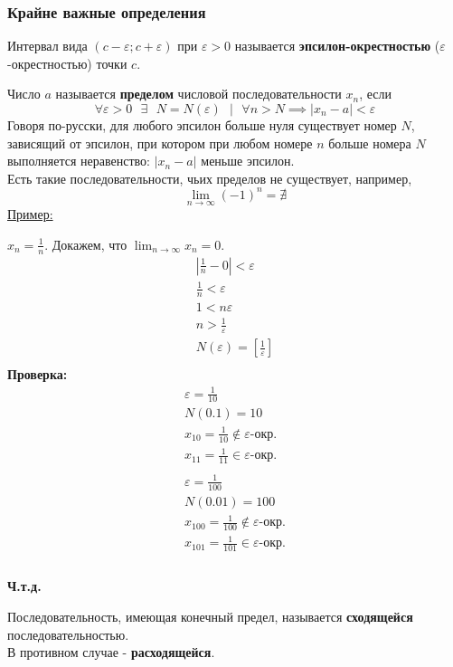 \documentclass[12pt]{article}
\begin{document}
    \subsubsection*{Крайне важные определения}
    \noindent Интервал вида $(c - \varepsilon; c + \varepsilon)$ при $\varepsilon > 0$ называется \textbf{эпсилон-окрестностью} ($\varepsilon$-окрестностью) точки $c$.\par\noindent
    Число $a$ называется \textbf{пределом} числовой последовательности $x_n$, если 
    \[\forall \varepsilon > 0 \text{ } \exists \text{ } N = N(\varepsilon) \text{ } \big| \text{ } \forall n > N \implies |x_n - a| < \varepsilon\]
    Говоря по-русски, для любого эпсилон больше нуля существует номер $N$, зависящий от эпсилон, при котором при любом номере $n$ больше номера $N$ выполняется неравенство: $|x_n - a|$ меньше эпсилон.\\
    Есть такие последовательности, чьих пределов не существует, например, \[\lim_{n\to\infty}(-1)^n = \nexists\]
    \underline{Пример:} 
    \begin{adjustwidth}{1.5em}{1.5em}
        $x_n = \frac{1}{n}$. Докажем, что $\lim_{n\to\infty}x_n = 0$.
        \begin{gather*}
            \left|\frac{1}{n} - 0\right| < \varepsilon\\
            \frac{1}{n} < \varepsilon\\
            1 < n\varepsilon\\
            n > \frac{1}{\varepsilon}\\
            N(\varepsilon) = \left[\frac{1}{\varepsilon}\right]\\
        \end{gather*}
        \textbf{Проверка:}\\
        \begin{gather*}
            \varepsilon = \frac{1}{10}\\
            N(0.1) = 10\\
            x_{10} = \frac{1}{10} \notin \varepsilon\text{-окр.}\\
            x_{11} = \frac{1}{11} \in \varepsilon\text{-окр.}\\\\ 
            \varepsilon = \frac{1}{100}\\
            N(0.01) = 100\\
            x_{100} = \frac{1}{100} \notin \varepsilon\text{-окр.}\\
            x_{101} = \frac{1}{101} \in \varepsilon\text{-окр.}\\\\
        \end{gather*}
        \begin{center}
            \textbf{Ч.т.д.}
        \end{center}
    \end{adjustwidth}
    Последовательность, имеющая конечный предел, называется \textbf{сходящейся} последовательностью.\\В противном случае - \textbf{расходящейся}.
\end{document}
